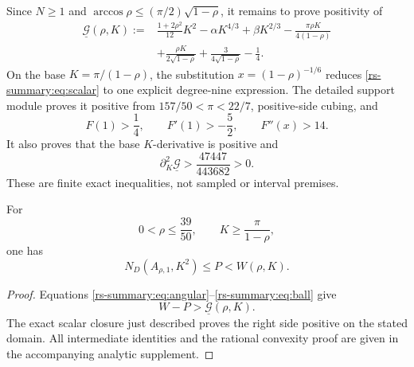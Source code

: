 Since $N\geq1$ and
$\arccos\rho\leq(\pi/2)\sqrt{1-\rho}$, it remains to prove positivity of
\begin{equation}
 \begin{aligned}
 \underline{\mathcal G}(\rho,K):={}&
 \frac{1+2\rho^2}{12}K^2-\alpha K^{4/3}+\beta K^{2/3}
 -\frac{\pi\rho K}{4(1-\rho)}\\
 &+\frac{\rho K}{2\sqrt{1-\rho}}
 +\frac3{4\sqrt{1-\rho}}-\frac14.
 \end{aligned}
 \label{rs-summary:eq:scalar}
\end{equation}
On the base $K=\pi/(1-\rho)$, the substitution
$x=(1-\rho)^{-1/6}$ reduces \eqref{rs-summary:eq:scalar} to one explicit
degree-nine expression.  The detailed support module proves it positive
from $157/50<\pi<22/7$, positive-side cubing, and
\[
 F(1)>\frac14,\qquad F'(1)>-\frac52,\qquad F''(x)>14.
\]
It also proves that the base $K$-derivative is positive and
\[
 \partial_K^2\underline{\mathcal G}
 >\frac{47447}{443682}>0.
\]
These are finite exact inequalities, not sampled or interval premises.

\begin{theorem}
\label{rs:thm:global-proxy}
For
\[
 0<\rho\leq\frac{39}{50},
 \qquad K\geq\frac\pi{1-\rho},
\]
one has
\[
 N_D(A_{\rho,1},K^2)\leq P<W(\rho,K).
\]
\end{theorem}

\begin{proof}
Equations \eqref{rs-summary:eq:angular}--\eqref{rs-summary:eq:ball}
give
\[
 W-P>\underline{\mathcal G}(\rho,K).
\]
The exact scalar closure just described proves the right side positive on
the stated domain.  All intermediate identities and the rational
convexity proof are given in the accompanying analytic supplement.
\end{proof}
